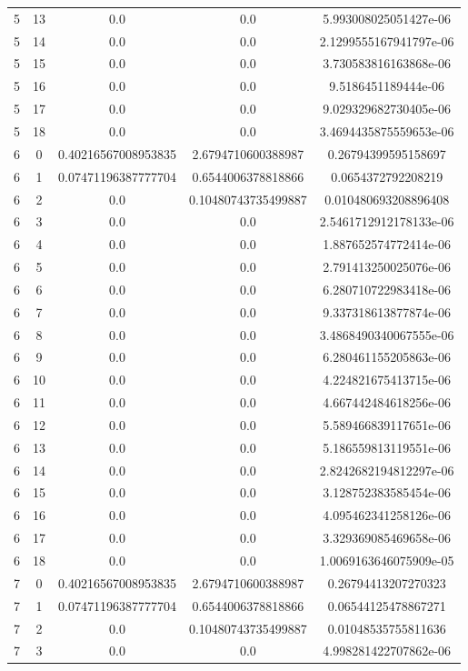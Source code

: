 \documentclass{article}
\begin{document}
\begin{table}[h]
\begin{tabular}{|c|c|c|c|c|}
5 & 13 & 0.0 & 0.0 & 5.993008025051427e-06 \\
5 & 14 & 0.0 & 0.0 & 2.1299555167941797e-06 \\
5 & 15 & 0.0 & 0.0 & 3.730583816163868e-06 \\
5 & 16 & 0.0 & 0.0 & 9.5186451189444e-06 \\
5 & 17 & 0.0 & 0.0 & 9.029329682730405e-06 \\
5 & 18 & 0.0 & 0.0 & 3.4694435875559653e-06 \\
6 & 0 & 0.40216567008953835 & 2.6794710600388987 & 0.26794399595158697 \\
6 & 1 & 0.07471196387777704 & 0.6544006378818866 & 0.0654372792208219 \\
6 & 2 & 0.0 & 0.10480743735499887 & 0.010480693208896408 \\
6 & 3 & 0.0 & 0.0 & 2.5461712912178133e-06 \\
6 & 4 & 0.0 & 0.0 & 1.887652574772414e-06 \\
6 & 5 & 0.0 & 0.0 & 2.791413250025076e-06 \\
6 & 6 & 0.0 & 0.0 & 6.280710722983418e-06 \\
6 & 7 & 0.0 & 0.0 & 9.337318613877874e-06 \\
6 & 8 & 0.0 & 0.0 & 3.4868490340067555e-06 \\
6 & 9 & 0.0 & 0.0 & 6.280461155205863e-06 \\
6 & 10 & 0.0 & 0.0 & 4.224821675413715e-06 \\
6 & 11 & 0.0 & 0.0 & 4.667442484618256e-06 \\
6 & 12 & 0.0 & 0.0 & 5.589466839117651e-06 \\
6 & 13 & 0.0 & 0.0 & 5.186559813119551e-06 \\
6 & 14 & 0.0 & 0.0 & 2.8242682194812297e-06 \\
6 & 15 & 0.0 & 0.0 & 3.128752383585454e-06 \\
6 & 16 & 0.0 & 0.0 & 4.095462341258126e-06 \\
6 & 17 & 0.0 & 0.0 & 3.329369085469658e-06 \\
6 & 18 & 0.0 & 0.0 & 1.0069163646075909e-05 \\
7 & 0 & 0.40216567008953835 & 2.6794710600388987 & 0.26794413207270323 \\
7 & 1 & 0.07471196387777704 & 0.6544006378818866 & 0.06544125478867271 \\
7 & 2 & 0.0 & 0.10480743735499887 & 0.01048535755811636 \\
7 & 3 & 0.0 & 0.0 & 4.998281422707862e-06 \\

\end{tabular}
\end{table}
\end{document}
